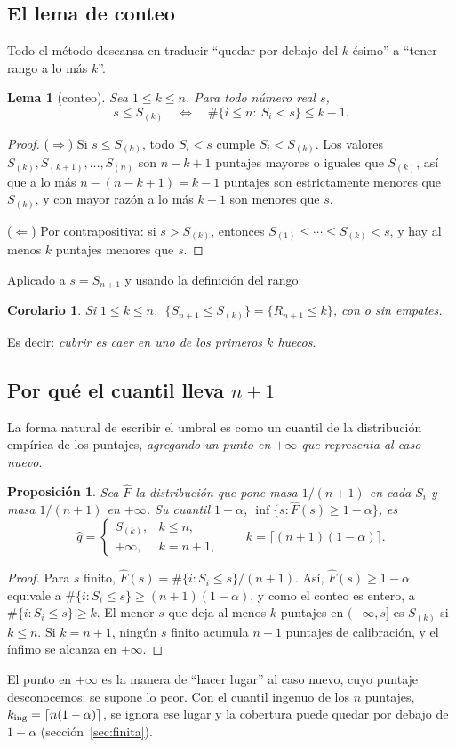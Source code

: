 \documentclass[11pt]{article}
\theoremstyle{plain}
\newtheorem{lema}[teorema]{Lema}
\newtheorem{proposicion}[teorema]{Proposición}
\newtheorem{corolario}[teorema]{Corolario}
\theoremstyle{definition}
\theoremstyle{remark}
\newcommand{\qhat}{\widehat q}
\begin{document}
\subsection{El lema de conteo}
Todo el método descansa en traducir ``quedar por debajo del $k$-ésimo'' a ``tener rango a lo más $k$''.
\begin{lema}[conteo]\label{lem:conteo}
Sea $1\le k\le n$. Para todo número real $s$,
\[
 s\le S_{(k)}\quad\iff\quad\#\{i\le n:\ S_i<s\}\le k-1 .
\]
\end{lema}
\begin{proof}
($\Rightarrow$) Si $s\le S_{(k)}$, todo $S_i<s$ cumple $S_i<S_{(k)}$. Los valores
$S_{(k)},S_{(k+1)},\dots,S_{(n)}$ son $n-k+1$ puntajes mayores o iguales que $S_{(k)}$, así que a lo
más $n-(n-k+1)=k-1$ puntajes son estrictamente menores que $S_{(k)}$, y con mayor razón a lo más
$k-1$ son menores que $s$.

($\Leftarrow$) Por contrapositiva: si $s>S_{(k)}$, entonces $S_{(1)}\le\cdots\le S_{(k)}<s$, y hay al
menos $k$ puntajes menores que $s$.
\end{proof}
Aplicado a $s=S_{n+1}$ y usando la definición del rango:
\begin{corolario}\label{cor:cubrir}
Si $1\le k\le n$, $\ \{S_{n+1}\le S_{(k)}\}=\{R_{n+1}\le k\}$, con o sin empates.
\end{corolario}
Es decir: \emph{cubrir es caer en uno de los primeros $k$ huecos}.

\subsection{Por qué el cuantil lleva $n+1$}
La forma natural de escribir el umbral es como un cuantil de la distribución empírica de los
puntajes, \emph{agregando un punto en $+\infty$ que representa al caso nuevo}.
\begin{proposicion}\label{prop:cuantil}
Sea $\widehat F$ la distribución que pone masa $1/(n+1)$ en cada $S_i$ y masa $1/(n+1)$ en $+\infty$.
Su cuantil $1-\alpha$, $\inf\{s:\widehat F(s)\ge1-\alpha\}$, es
\[
 \qhat=\begin{cases}S_{(k)},&k\le n,\\+\infty,&k=n+1,\end{cases}\qquad k=\lceil(n+1)(1-\alpha)\rceil.
\]
\end{proposicion}
\begin{proof}
Para $s$ finito, $\widehat F(s)=\#\{i:S_i\le s\}/(n+1)$. Así, $\widehat F(s)\ge1-\alpha$ equivale a
$\#\{i:S_i\le s\}\ge(n+1)(1-\alpha)$, y como el conteo es entero, a $\#\{i:S_i\le s\}\ge k$. El menor
$s$ que deja al menos $k$ puntajes en $(-\infty,s]$ es $S_{(k)}$ si $k\le n$. Si $k=n+1$, ningún $s$
finito acumula $n+1$ puntajes de calibración, y el ínfimo se alcanza en $+\infty$.
\end{proof}
El punto en $+\infty$ es la manera de ``hacer lugar'' al caso nuevo, cuyo puntaje desconocemos: se
supone lo peor. Con el cuantil ingenuo de los $n$ puntajes, $k_{\rm ing}=\lceil n(1-\alpha)\rceil$,
se ignora ese lugar y la cobertura puede quedar por debajo de $1-\alpha$ (sección~\ref{sec:finita}).
\end{document}
